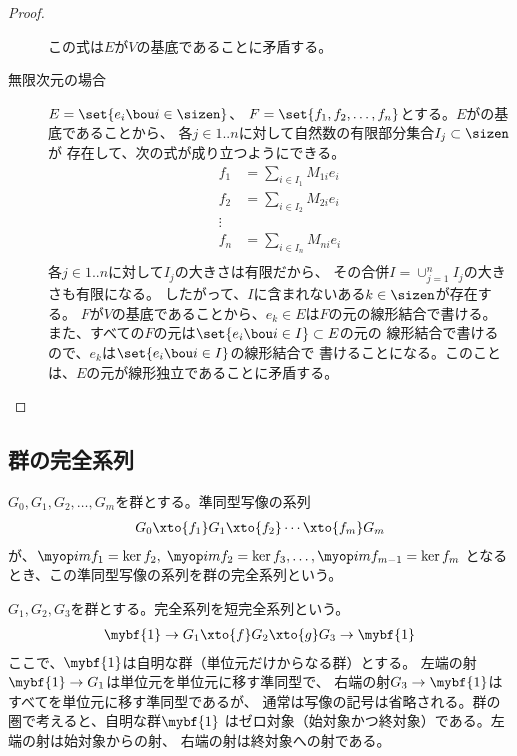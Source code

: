 \begin{proof}
\begin{description}
			この式は$E$が$V$の基底であることに矛盾する。
			\item[無限次元の場合] $E=\set{e_i\bou i\in\sizen}$、
			$F=\set{f_1,f_2,\dots,f_n}$とする。$E$がの基底であることから、
			各$j\in1..n$に対して自然数の有限部分集合$I_j\subset\sizen$が
			存在して、次の式が成り立つようにできる。
			\begin{equation*}\begin{split} %
				f_1 &= \sum_{i\in I_1}M_{1i}e_i \\
				f_2 &= \sum_{i\in I_2}M_{2i}e_i \\
				\vdots \\
				f_n &= \sum_{i\in I_n}M_{ni}e_i \\
			\end{split}\end{equation*} %
			各$j\in1..n$に対して$I_j$の大きさは有限だから、
			その合併$I=\cup_{j=1}^nI_j$の大きさも有限になる。
			したがって、$I$に含まれないある$k\in\sizen$が存在する。
			$F$が$V$の基底であることから、$e_k\in E$は$F$の元の線形結合で書ける。
			また、すべての$F$の元は$\set{e_i\bou i\in I}\subset E$の元の
			線形結合で書けるので、$e_k$は$\set{e_i\bou i\in I}$の線形結合で
			書けることになる。このことは、$E$の元が線形独立であることに矛盾する。
		\end{description} %
	\end{proof} %

\subsection{群の完全系列}\label{s2:群の完全系列} %
	\begin{definition}[群の完全系列]\label{def:群の完全系列} %
		$G_0,G_1,G_2,\dots,G_m$を群とする。準同型写像の系列
		\begin{equation*}\begin{split} %
			G_0 \xto{f_1} G_1 \xto{f_2} \cdots \xto{f_m} G_m
		\end{split}\end{equation*} %
		が、$\im f_1=\ker f_2,\;\im f_2=\ker f_3,\dots,\im f_{m-1}=\ker f_m$
		となるとき、この準同型写像の系列を群の完全系列という。
	\end{definition} %

	\begin{definition}[群の短完全系列]\label{def:群の短完全系列} %
		$G_1,G_2,G_3$を群とする。完全系列を短完全系列という。
		\begin{equation*}\begin{split} %
			\mybf{1} \to G_1 \xto{f} G_2 \xto{g} G_3 \to \mybf{1}
		\end{split}\end{equation*} %
		ここで、$\mybf{1}$は自明な群（単位元だけからなる群）とする。
		左端の射$\mybf{1}\to G_1$は単位元を単位元に移す準同型で、
		右端の射$G_3\to\mybf{1}$はすべてを単位元に移す準同型であるが、
		通常は写像の記号は省略される。群の圏で考えると、自明な群$\mybf{1}$
		はゼロ対象（始対象かつ終対象）である。左端の射は始対象からの射、
		右端の射は終対象への射である。
	\end{definition} %

